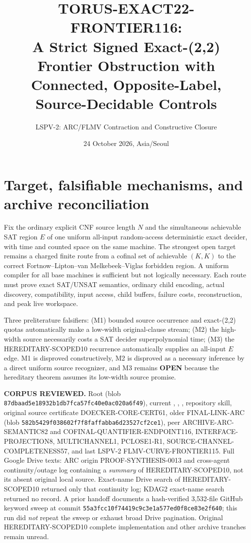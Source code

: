 \documentclass[11pt]{article}
\title{TORUS-EXACT22-FRONTIER116:\\
A Strict Signed Exact-(2,2) Frontier Obstruction with\\
Connected, Opposite-Label, Source-Decidable Controls}
\author{LSPV-2: ARC/FLMV Contraction and Constructive Closure}
\date{24 October 2026, Asia/Seoul}
\newcommand{\OPEN}{\textbf{OPEN}}
\begin{document}
\maketitle
\begin{center}\end{center}

\section{Target, falsifiable mechanisms, and archive reconciliation}
Fix the ordinary explicit CNF source length \(N\) and the simultaneous achievable SAT region \(E\) of one uniform all-input random-access deterministic exact decider, with time and counted space on the same machine. The strongest open target remains a charged finite route from a cofinal set of achievable \((K,K)\) to the correct Fortnow--Lipton--van Melkebeek--Viglas forbidden region. A uniform compiler for all base machines is sufficient but not logically necessary. Each route must prove exact SAT/UNSAT semantics, ordinary child encoding, actual discovery, compatibility, input access, child buffers, failure costs, reconstruction, and peak live workspace.

Three preliterature falsifiers: (M1) bounded source occurrence and exact-(2,2) quotas automatically make a low-width original-clause stream; (M2) the high-width source necessarily costs a SAT decider superpolynomial time; (M3) the HEREDITARY-SCOPED10 recurrence automatically supplies an all-input \(E\) edge. M1 is disproved constructively, M2 is disproved as a necessary inference by a direct uniform source recognizer, and M3 remains \OPEN{} because the hereditary theorem assumes its low-width source promise.

\noindent\textbf{CORPUS REVIEWED.} Root  (blob \texttt{87dbaad5e18932b1db7fca57fc40e0ac020a6f49}), current , , , repository skill, original source certificate DOECKER-CORE-CERT61, older FINAL-LINK-ARC (blob \texttt{582b5429f038602f7f8faffabba6d23527cf2ce1}), peer ARCHIVE-ARC-SEMANTIC82 and COFINAL-QUANTIFIER-ENDPOINT116, INTERFACE-PROJECTION8, MULTICHANNEL1, PCLOSE1-R1, SOURCE-CHANNEL-COMPLETENESS57, and last LSPV-2 FLMV-CURVE-FRONTIER115. Full Google Drive texts: ARC origin PROOF-SYNTHESIS-0013 and cross-agent continuity/outage log containing a \emph{summary} of HEREDITARY-SCOPED10, not its absent original local source. Exact-name Drive search of HEREDITARY-SCOPED10 returned only that continuity log; KDAG2 exact-name search returned no record. A prior handoff documents a hash-verified 3,532-file GitHub keyword sweep at commit \texttt{55a3fcc10f74419c9c3e1a577ed0f8ce83e2f640}; this run did \emph{not} repeat the sweep or exhaust broad Drive pagination. Original HEREDITARY-SCOPED10 complete implementation and other archive tranches remain unread.
\end{document}
